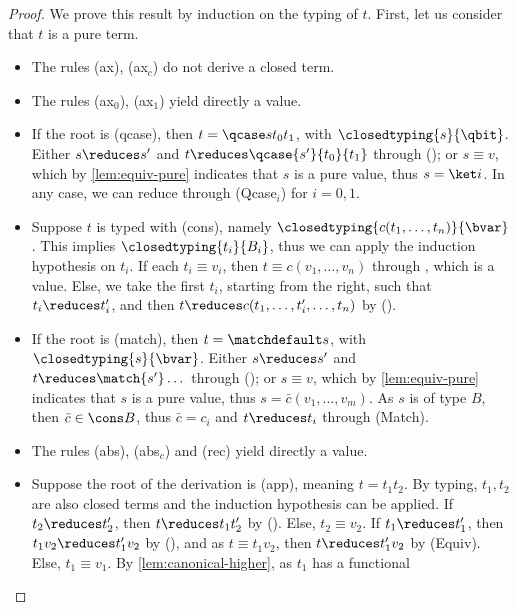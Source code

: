 \begin{proof}
  We prove this result by induction on the typing of $t$.
  First, let us consider that $t$ is a pure term.

  \begin{itemize}
    \item The rules (ax), (ax$_c$) do not derive a closed term.
    \item The rules (ax$_0$), (ax$_1$) yield directly a value.
    \item If the root is (qcase), then $t = \qcase s {t_0}
      {t_1}$, with $\closedtyping{s}{\qbit}$.
      Either $s \reduces s'$ and $t \reduces \qcase {s'} {t_0}
      {t_1}$ through (\evalcontext);
      or $s \equiv v$, which by \autoref{lem:equiv-pure} indicates
      that $s$ is a pure value, thus $s = \ket i$.
      In any case, we can reduce through (Qcase$_i$) for $i = 0, 1$.
    \item Suppose $t$ is typed with (cons), namely
      $\closedtyping{c(t_1, \dots, t_n)}{\bvar}$.
      This implies $\closedtyping{t_i}{B_i}$, thus we can apply the
      induction hypothesis on $t_i$.
      If each $t_i \equiv v_i$, then $t \equiv c(v_1, \dots, v_n)$
      through \equivcontext, which is a value.
      Else, we take the first $t_i$, starting from the right, such
      that $t_i \reduces t_i'$, and then $t \reduces c(t_1, \dots,
      t_i',\dots, t_n)$ by (\evalcontext).
    \item If the root is (match), then $t = \matchdefault s$,
      with $\closedtyping{s}{\bvar}$.
      Either $s \reduces s'$ and $t \reduces \match {s'} \dots$
      through (\evalcontext);
      or $s \equiv v$, which by \autoref{lem:equiv-pure} indicates
      that $s$ is a pure value, thus $s = \bar c(v_1, \dots, v_m)$.
      As $s$ is of type $B$, then $\bar c \in \cons B$, thus $\bar c
      = c_i$ and $t \reduces t_i$ through (Match).
    \item The rules (abs), (abs$_c$) and (rec) yield directly a value.
    \item Suppose the root of the derivation is (app), meaning $t = t_1 t_2$.
      By typing, $t_1, t_2$ are also closed terms and the induction
      hypothesis can be applied.
      If $t_2 \reduces t_2'$, then $t \reduces t_1t_2'$ by (\evalcontext).
      Else, $t_2 \equiv v_2$.
      If $t_1 \reduces t_1'$, then $t_1v_2 \reduces t_1'v_2$ by
      (\evalcontext), and as $t \equiv t_1v_2$, then $t \reduces
      t_1'v_2$ by (Equiv).
      Else, $t_1 \equiv v_1$.
      By \autoref{lem:canonical-higher}, as $t_1$ has a functional

\end{itemize}
\end{proof}
